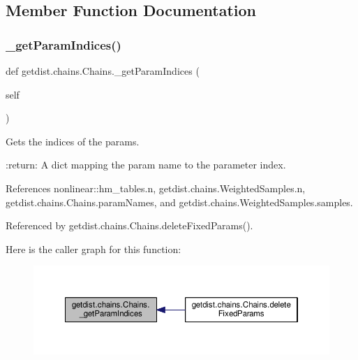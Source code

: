 \subsection{Member Function Documentation}
\mbox{\label{classgetdist_1_1chains_1_1Chains_a3396bdca18b18c9a9ebb14b61b6bd4ce}} 
\subsubsection{\texorpdfstring{\+\_\+get\+Param\+Indices()}{\_getParamIndices()}}
{\footnotesize\ttfamily def getdist.\+chains.\+Chains.\+\_\+get\+Param\+Indices (\begin{DoxyParamCaption}\item[{}]{self }\end{DoxyParamCaption})\hspace{0.3cm}{\ttfamily [private]}}

\begin{DoxyVerb}Gets the indices of the params.

:return: A dict mapping the param name to the parameter index.
\end{DoxyVerb}
 

References nonlinear\+::hm\+\_\+tables.\+n, getdist.\+chains.\+Weighted\+Samples.\+n, getdist.\+chains.\+Chains.\+param\+Names, and getdist.\+chains.\+Weighted\+Samples.\+samples.



Referenced by getdist.\+chains.\+Chains.\+delete\+Fixed\+Params().

Here is the caller graph for this function\+:
\nopagebreak
\begin{figure}[H]
\begin{center}
\leavevmode
\includegraphics[width=350pt]{classgetdist_1_1chains_1_1Chains_a3396bdca18b18c9a9ebb14b61b6bd4ce_icgraph}
\end{center}
\end{figure}
\mbox{\label{classgetdist_1_1chains_1_1Chains_a356b9768604fcc93660fa92170d7857a}} 
